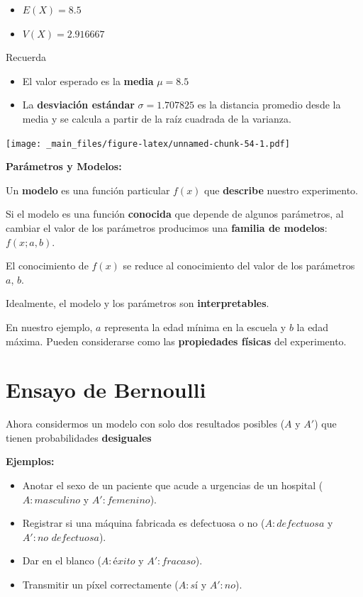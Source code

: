 \documentclass[
]{book}
\providecommand{\tightlist}{%
  \setlength{\itemsep}{0pt}\setlength{\parskip}{0pt}}
\begin{document}
\begin{itemize}
\tightlist
\item
  \(E(X)=8.5\)
\item
  \(V(X)=2.916667\)
\end{itemize}

Recuerda

\begin{itemize}
\item
  El valor esperado es la \textbf{media} \(\mu=8.5\)
\item
  La \textbf{desviación estándar} \(\sigma=1.707825\) es la distancia promedio desde la media y se calcula a partir de la raíz cuadrada de la varianza.
\end{itemize}

\texttt{[image: \_main\_files/figure-latex/unnamed-chunk-54-1.pdf]}

\textbf{Parámetros y Modelos:}

Un \textbf{modelo} es una función particular \(f(x)\) que \textbf{describe} nuestro experimento.

Si el modelo es una función \textbf{conocida} que depende de algunos parámetros, al cambiar el valor de los parámetros producimos una \textbf{familia de modelos}: \(f(x; a,b)\).

El conocimiento de \(f(x)\) se reduce al conocimiento del valor de los parámetros \(a\), \(b\).

Idealmente, el modelo y los parámetros son \textbf{interpretables}.

En nuestro ejemplo, \(a\) representa la edad mínima en la escuela y \(b\) la edad máxima. Pueden considerarse como las \textbf{propiedades físicas} del experimento.

\hypertarget{ensayo-de-bernoulli}{%
\section{Ensayo de Bernoulli}\label{ensayo-de-bernoulli}}

Ahora considermos un modelo con solo dos resultados posibles (\(A\) y \(A'\)) que tienen probabilidades \textbf{desiguales}

\textbf{Ejemplos:}

\begin{itemize}
\item
  Anotar el sexo de un paciente que acude a urgencias de un hospital (\(A:masculino\) y \(A':femenino\)).
\item
  Registrar si una máquina fabricada es defectuosa o no (\(A:defectuosa\) y \(A':no\,\,defectuosa\)).
\item
  Dar en el blanco (\(A:éxito\) y \(A':fracaso\)).
\item
  Transmitir un píxel correctamente (\(A:sí\) y \(A':no\)).
\end{itemize}
\end{document}
